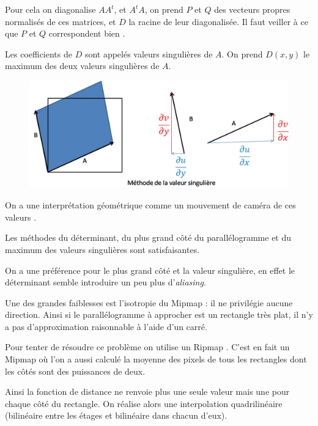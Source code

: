 Pour cela on diagonalise $AA^t$, et $A^tA$, on prend $P$ et $Q$ des vecteurs propres normalisés de ces matrices, et $D$ la racine de leur diagonalisée. Il faut veiller à ce que $P$ et $Q$ correspondent bien \cite{abdi2007singular}.

Les coefficients de $D$ sont appelés valeurs singulières de $A$. On prend $D(x,y)$ le maximum des deux valeurs singulières de $A$.


\begin{figure}[h!]
\centering
\includegraphics[scale=0.5]{methode_valeur_singuliere.jpg}
\end{figure}

On a une interprétation géométrique comme un mouvement de caméra de ces valeurs \cite{morel2009asift}.


Les méthodes du déterminant, du plus grand côté du parallélogramme et du maximum des valeurs singulières sont satisfaisantes.

On a une préférence pour le plus grand côté et la valeur singulière, en effet le déterminant semble introduire un peu plus d'\emph{aliasing}.


Une des grandes faiblesses est l'isotropie du Mipmap : il ne privilégie aucune direction. Ainsi si le parallélogramme à approcher est un rectangle très plat, il n'y a pas d'approximation raisonnable à l'aide d'un carré.

Pour tenter de résoudre ce problème on utilise un Ripmap \cite{akenine2008real}. C'est en fait un Mipmap où l'on a aussi calculé la moyenne des pixels de tous les rectangles dont les côtés sont des puissances de deux.

Ainsi la fonction de distance ne renvoie plus une seule valeur mais une pour chaque côté du rectangle. On réalise alors une interpolation quadrilinéaire (bilinéaire entre les étages et bilinéaire dans chacun d'eux).%



